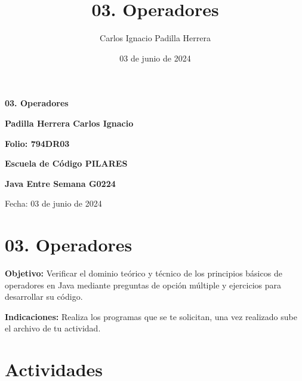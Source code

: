 \documentclass{article}
\title{03. Operadores}
\author{Carlos Ignacio Padilla Herrera}
\date{03 de junio de 2024}
\begin{document}

\tcbstartrecording

\begin{titlepage}
    \centering
    \vspace*{2cm}

    \Huge
    \textbf{03. Operadores}

    \vspace{1.5cm}

    \LARGE
    \textbf{Padilla Herrera Carlos Ignacio}

    \vspace{0.5cm}

    \Large
    \textbf{Folio: 794DR03}

    \vspace{1.5cm}

    \LARGE
    \textbf{Escuela de Código PILARES}


    \LARGE
    \textbf{Java Entre Semana G0224}

    \vspace{0.5cm}

    \Large
    Fecha: 03 de junio de 2024

    \vfill
\end{titlepage}

\maketitle

\section*{03. Operadores}
\textbf{Objetivo:} Verificar el dominio teórico y técnico de los principios básicos de operadores en Java mediante preguntas de opción múltiple y ejercicios para desarrollar su código.

\textbf{Indicaciones:} Realiza los programas que se te solicitan, una vez realizado sube el archivo de tu actividad.

\section*{Actividades}
\end{document}
